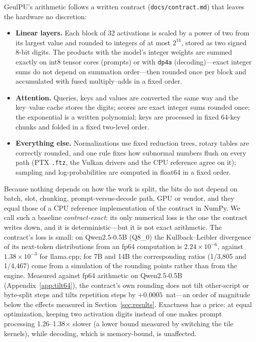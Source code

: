 \documentclass[11pt]{article}
\begin{document}
GeulPU's arithmetic follows a written contract (\texttt{docs/contract.md}) that leaves the hardware no discretion:
\begin{itemize}
\item \textbf{Linear layers.} Each block of 32 activations is scaled by a power of two from its largest value and rounded to
      integers of at most $2^{14}$, stored as two signed 8-bit digits. The products with the model's integer weights are
      summed exactly on int8 tensor cores (prompts) or with \texttt{dp4a} (decoding)---exact integer sums do not depend on
      summation order---then rounded once per block and accumulated with fused multiply--adds in a fixed order.
\item \textbf{Attention.} Queries, keys and values are converted the same way and the key--value cache stores the digits;
      scores are exact integer sums rounded once; the exponential is a written polynomial; keys are processed in fixed
      64-key chunks and folded in a fixed two-level order.
\item \textbf{Everything else.} Normalizations use fixed reduction trees, rotary tables are correctly rounded, and one rule
      fixes how subnormal numbers flush on every path (PTX \texttt{.ftz}, the Vulkan drivers and the CPU reference agree on
      it); sampling and log-probabilities are computed in float64 in a fixed order.
\end{itemize}

Because nothing depends on how the work is split, the bits do not depend on batch, slot, chunking, prompt-versus-decode path,
GPU or vendor, and they equal those of a CPU reference implementation of the contract in NumPy. We call such a baseline
\emph{contract-exact}: its only numerical loss is the one the contract writes down, and it is deterministic---but it is not
exact arithmetic. The contract's loss is small: on Qwen2.5-0.5B (Q8\_0) the Kullback--Leibler divergence of its next-token
distributions from an fp64 computation is $2.24\times10^{-6}$, against $1.38\times10^{-3}$ for llama.cpp; for 7B and 14B
the corresponding ratios (1/3,805 and 1/4,467) come from a simulation of the rounding points rather than from the engine.
Measured against fp64 arithmetic on Qwen2.5-0.5B (Appendix~\ref{app:tilt64}), the contract's own rounding does not tilt
other-script or byte-split steps and tilts repetition steps by $+0.0005$~nat---an order of magnitude below the effects measured
in Section~\ref{sec:results}. Exactness has a price: at equal optimization, keeping two
activation digits instead of one makes prompt processing 1.26--1.38$\times$ slower (a lower bound measured by switching the
tile kernels), while decoding, which is memory-bound, is unaffected.
\end{document}
